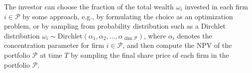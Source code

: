 \documentclass[11pt]{article}
\theoremstyle{definition}
\begin{document}
The investor can choose the fraction of the total wealth $\omega_{i}$ invested in each firm $i\in\mathcal{P}$ by some approach, e.g., by formulating the choice as an optimization problem, or by sampling from probability distribution such as a Dirchlet distribution $\omega_{i}\sim\text{Dirchlet}(\alpha_{1},\alpha_{2},\dots,\alpha_{\dim\mathcal{P}})$, where $\alpha_{i}$ denotes the concentration parameter for firm $i\in\mathcal{P}$, and then compute the NPV of the portfolio $\mathcal{P}$ at time $T$ by sampling the final share price of each firm in the portfolio $\mathcal{P}$.


\end{document}
